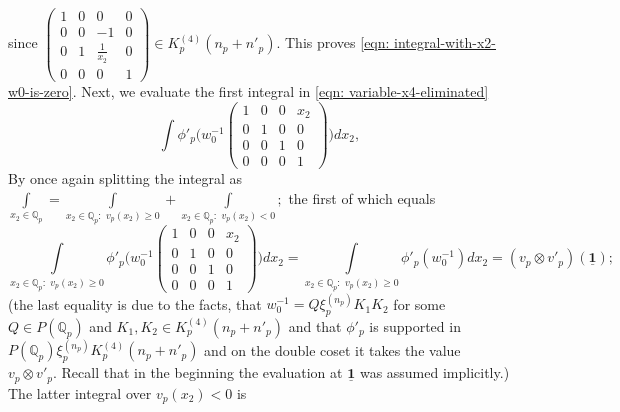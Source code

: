 \documentclass[11pt]{amsart}
\newcommand{\mirp}[1]{K_p^{(4)}(#1)}
\begin{document}
since 
$\left(\begin{smallmatrix}
		1 & 0 & 0 & 0 \\
		0 & 0 & -1 & 0 \\
		0 & 1 & \frac{1}{x_{2}} & 0 \\
		0 & 0 & 0 & 1
	\end{smallmatrix}\right) \in \mirp{n_p + n'_p}.$ 
This proves \eqref{eqn: integral-with-x2-w0-is-zero}. Next, we evaluate the first integral in \eqref{eqn: variable-x4-eliminated} 
\[\int \phi'_p \biggl( w_0^{-1}\left(\begin{smallmatrix}
	1 & 0 & 0 & x_{2} \\
	0 & 1 & 0 & 0 \\
	0 & 0 & 1 & 0 \\
	0 & 0 & 0 & 1
\end{smallmatrix}\right)   \biggr) dx_2,\]
By once again splitting the integral as 
$\int\limits_{x_2 \in \mathbb{Q}_p} = \int\limits_{x_2 \in \mathbb{Q}_p:\,\, v_p(x_2) \geq 0} + \int\limits_{x_2 \in \mathbb{Q}_p:\,\, v_p(x_2) < 0};$ the first of which equals
\[\int\limits_{x_2 \in \mathbb{Q}_p: \,\, v_p(x_2) \geq 0} \phi'_p \biggl( w_0^{-1}\left(\begin{smallmatrix}
	1 & 0 & 0 & x_{2} \\
	0 & 1 & 0 & 0 \\
	0 & 0 & 1 & 0 \\
	0 & 0 & 0 & 1
\end{smallmatrix}\right)   \biggr) dx_2 = \int\limits_{x_2 \in \mathbb{Q}_p: \,\, v_p(x_2) \geq 0} \phi'_p(w_0^{-1}) dx_2 = (v_p\otimes v'_p)(\underline{\mathbf{1}});\]
(the last equality is due to the facts, that $w_0^{-1}= Q\xi_{p}^{(n_p)}K_1K_2$ for some $Q\in P(\mathbb{Q}_p)$ and 
$K_1, K_2 \in \mirp{n_p + n'_p}$ and that $\phi'_p$ is supported in $ P(\mathbb{Q}_p) \xi_p^{(n_p)} \mirp{n_p + n'_p}$ 
and on the double coset it takes the value $v_p \otimes v'_p.$ Recall that in the beginning the evaluation at $\underline{\mathbf{1}}$ was assumed implicitly.) The latter integral over $v_p(x_2) < 0$ is
\end{document}
